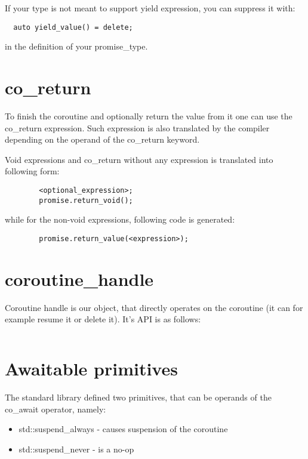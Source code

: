 \documentclass[twoside,twocolumn, 10pt]{article}
\begin{document}
	If your type is not meant to support yield
	expression, you can suppress it with:

\begin{verbatim}
  auto yield_value() = delete;
\end{verbatim}

  in the definition of your promise\_type.

\section{co\_return}
	To finish the coroutine and optionally return the value from it
	one can use the co\_return expression. Such expression is also
	translated by the compiler depending on the operand of the
	co\_return keyword.

	Void expressions and co\_return without any expression is
	translated into following form:
	\begin{verbatim}
		<optional_expression>;
		promise.return_void();
	\end{verbatim}

	while for the non-void expressions, following code is generated:

	\begin{verbatim}
		promise.return_value(<expression>);
	\end{verbatim}

\section{coroutine\_handle}

	Coroutine handle is our object, that directly operates on the coroutine
	(it can for example resume it or delete it). It's API is as follows:

	\inputminted{c++}{code-examples/theory-custom-coroutine/coroutine-handle.hpp}

	\section{Awaitable primitives}

	The standard library defined two primitives, that can be
	operands of the co\_await operator, namely:
	\begin{itemize}
		\item std::suspend\_always - causes suspension of the coroutine
		\item std::suspend\_never - is a no-op
	\end{itemize}
\end{document}
